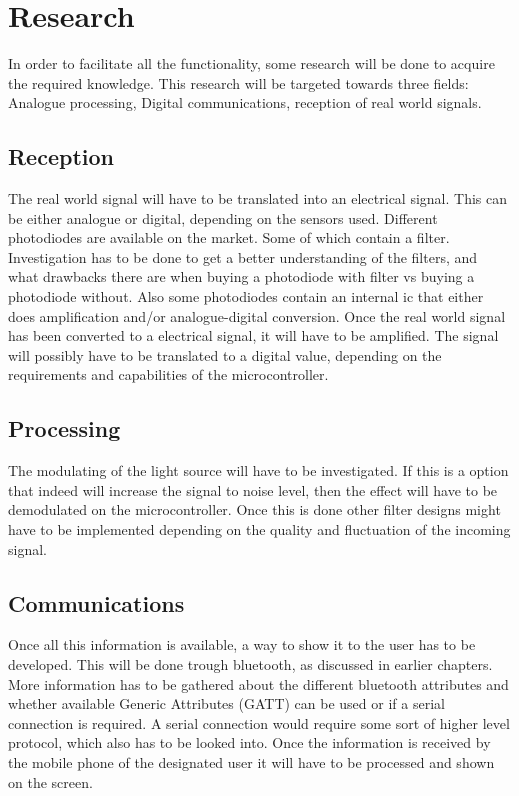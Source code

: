 \documentclass{report}
\begin{document}
\chapter{Research}
In order to facilitate all the functionality, some research will be done to acquire the required knowledge. This research will be targeted towards three fields: Analogue processing, Digital communications, reception of real world signals.
\section{Reception}
The real world signal will have to be translated into an electrical signal. This can be either analogue or digital, depending on the sensors used. Different photodiodes are available on the market. Some of which contain a filter. Investigation has to be done to get a better understanding of the filters, and what drawbacks there are when buying a photodiode with filter vs buying a photodiode without. Also some photodiodes contain an internal ic that either does amplification and/or analogue-digital conversion. Once the real world signal has been converted to a electrical signal, it will have to be amplified. The signal will possibly have to be translated to a digital value, depending on the requirements and capabilities of the microcontroller.
\section{Processing}
The modulating of the light source will have to be investigated. If this is a option that indeed will increase the signal to noise level, then the effect will have to be demodulated on the microcontroller. Once this is done other filter designs might have to be implemented depending on the quality and fluctuation of the incoming signal.
\section{Communications}
Once all this information is available, a way to show it to the user has to be developed. This will be done trough bluetooth, as discussed in earlier chapters. More information has to be gathered about the different bluetooth attributes and whether available Generic Attributes (GATT) can be used or if a serial connection is required. A serial connection would require some sort of higher level protocol, which also has to be looked into. Once the information is received by the mobile phone of the designated user it will have to be processed and shown on the screen.
\end{document}
